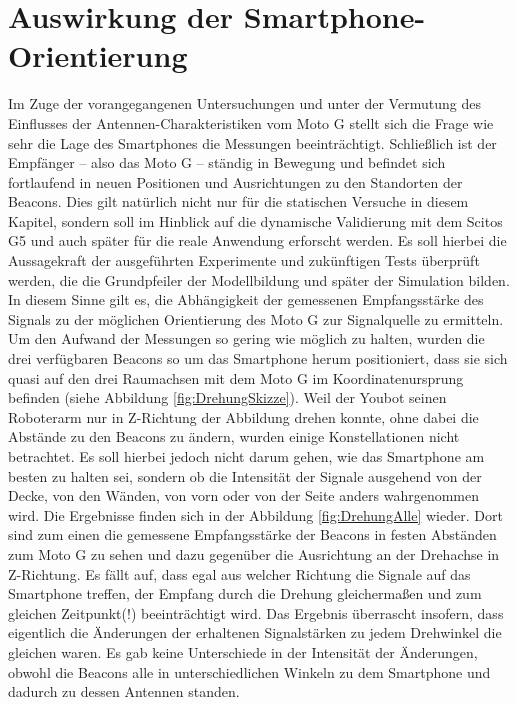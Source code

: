 \section{Auswirkung der Smartphone-Orientierung}
Im Zuge der vorangegangenen Untersuchungen und unter der Vermutung des Einflusses der Antennen-Charakteristiken vom Moto G stellt sich die Frage wie sehr die Lage des Smartphones die Messungen beeinträchtigt. Schließlich ist der Empfänger -- also das Moto G -- ständig in Bewegung und befindet sich fortlaufend in neuen Positionen und Ausrichtungen zu den Standorten der Beacons. Dies gilt natürlich nicht nur für die statischen Versuche in diesem Kapitel, sondern soll im Hinblick auf die dynamische Validierung mit dem Scitos G5 und auch später für die reale Anwendung erforscht werden. Es soll hierbei die Aussagekraft der ausgeführten Experimente und zukünftigen Tests überprüft werden, die die Grundpfeiler der Modellbildung und später der Simulation bilden. In diesem Sinne gilt es, die Abhängigkeit der gemessenen Empfangsstärke des Signals zu der möglichen Orientierung des Moto G zur Signalquelle zu ermitteln. Um den Aufwand der Messungen so gering wie möglich zu halten, wurden die drei verfügbaren Beacons so um das Smartphone herum positioniert, dass sie sich quasi auf den drei Raumachsen mit dem Moto G im Koordinatenursprung befinden (siehe Abbildung \ref{fig:DrehungSkizze}). Weil der Youbot seinen Roboterarm nur in Z-Richtung der Abbildung drehen konnte, ohne dabei die Abstände zu den Beacons zu ändern, wurden einige Konstellationen nicht betrachtet. Es soll hierbei jedoch nicht darum gehen, wie das Smartphone am besten zu halten sei, sondern ob die Intensität der Signale ausgehend von der Decke, von den Wänden, von vorn oder von der Seite anders wahrgenommen wird. Die Ergebnisse finden sich in der Abbildung \ref{fig:DrehungAlle} wieder. Dort sind zum einen die gemessene Empfangsstärke der Beacons in festen Abständen zum Moto G zu sehen und dazu gegenüber die Ausrichtung an der Drehachse in Z-Richtung. Es fällt auf, dass egal aus welcher Richtung die Signale auf das Smartphone treffen, der Empfang durch die Drehung gleichermaßen und zum gleichen Zeitpunkt(!) beeinträchtigt wird. Das Ergebnis überrascht insofern, dass eigentlich die Änderungen der erhaltenen Signalstärken zu jedem Drehwinkel die gleichen waren. Es gab keine Unterschiede in der Intensität der Änderungen, obwohl die Beacons alle in unterschiedlichen Winkeln zu dem Smartphone und dadurch zu dessen Antennen standen. 
